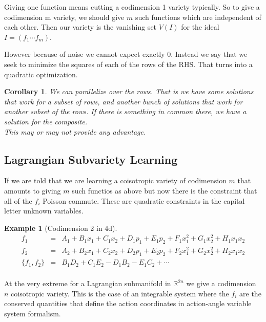 \documentclass[a4paper,landscape]{article}
\theoremstyle{change}
\newtheorem{cor}[equation]{Corollary}
\newtheorem{example}[equation]{Example}
\theoremstyle{nonumberplain}
\numberwithin{equation}{section}
\newcommand\setof[1]{\{ #1 \}}
\begin{document}
Giving one function means cutting a codimension 1 variety typically. So to give a codimension m variety, we should give $m$ such functions which are independent of each other. Then our variety is the vanishing set $V(I)$ for the ideal $I = (f_1 \cdots f_m)$.

However because of noise we cannot expect exactly $0$. Instead we say that we seek to minimize the squares of each of the rows of the RHS. That turns into a quadratic optimization.

\begin{cor}
We can parallelize over the rows. That is we have some solutions that work for a subset of rows, and another bunch of solutions that work for another subset of the rows. If there is something in common there, we have a solution for the composite.\\
This may or may not provide any advantage.
\end{cor}

\subsection{Lagrangian Subvariety Learning}

If we are told that we are learning a coisotropic variety of codimension $m$ that amounts to giving $m$ such functios as above but now there is the constraint that all of the $f_i$ Poisson commute. These are quadratic constraints in the capital letter unknown variables.

\begin{example}[Codimension 2 in 4d]

\begin{eqnarray*}
f_1 &=& A_1 + B_1 x_1 + C_1 x_2 + D_1 p_1 + E_1 p_2 + F_1 x_1^2 + G_1 x_2^2 + H_1 x_1 x_2\\
f_2 &=& A_2 + B_2 x_1 + C_2 x_2 + D_2 p_1 + E_2 p_2 + F_2 x_1^2 + G_2 x_2^2 + H_2 x_1 x_2\\
\setof{ f_1 , f_2 } &=& B_1 D_2 + C_1 E_2 - D_1 B_2 - E_1 C_2 + \cdots\\
\end{eqnarray*}

\end{example}

At the very extreme for a Lagrangian submanifold in $\mathbb{R}^{2n}$ we give a codimension $n$ coisotropic variety. This is the case of an integrable system where the $f_i$ are the conserved quantities that define the action coordinates in action-angle variable system formalism.
\end{document}
